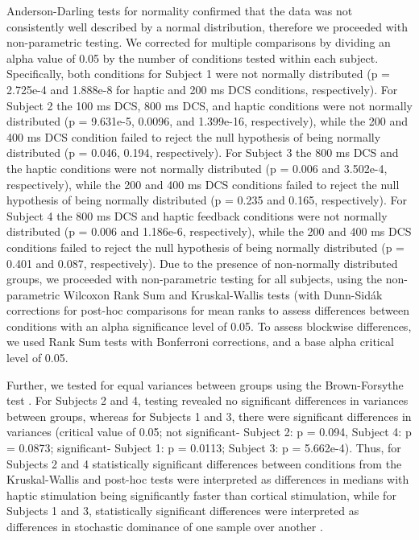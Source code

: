  Anderson-Darling tests for normality confirmed that the data was not consistently well described by a normal distribution, therefore we proceeded with non-parametric testing. We corrected for multiple comparisons by dividing an alpha value of 0.05 by the number of conditions tested within each subject. Specifically, both conditions for Subject 1 were not normally distributed (p = 2.725e-4 and 1.888e-8 for haptic and 200 ms DCS conditions, respectively). For Subject 2 the 100 ms DCS, 800 ms DCS, and haptic conditions were not normally distributed (p = 9.631e-5, 0.0096, and 1.399e-16, respectively), while the 200 and 400 ms DCS condition failed to reject the null hypothesis of being normally distributed (p = 0.046, 0.194, respectively). For Subject 3 the 800 ms DCS and the haptic conditions were not normally distributed (p = 0.006 and 3.502e-4, respectively), while the 200 and 400 ms DCS conditions failed to reject the null hypothesis of being normally distributed (p = 0.235 and 0.165, respectively). For Subject 4 the 800 ms DCS and haptic feedback conditions were not normally distributed (p = 0.006 and 1.186e-6, respectively), while the 200 and 400 ms DCS conditions failed to reject the null hypothesis of being normally distributed (p = 0.401 and 0.087, respectively). Due to the presence of non-normally distributed groups, we proceeded with non-parametric testing for all subjects, using the non-parametric Wilcoxon Rank Sum and Kruskal-Wallis tests (with Dunn-Sidák corrections for post-hoc comparisons for mean ranks\cite{Dinno2015,Sidak1967} to assess differences between conditions with an alpha significance level of 0.05. To assess blockwise differences, we used Rank Sum tests with Bonferroni corrections, and a base alpha critical level of 0.05.
 
 Further, we tested for equal variances between groups using the Brown-Forsythe test \cite{Brown1974}. For Subjects 2 and 4, testing revealed no significant differences in variances between groups, whereas for Subjects 1 and 3, there were significant differences in variances (critical value of 0.05; not significant- Subject 2: p = 0.094, Subject 4: p = 0.0873; significant- Subject 1: p = 0.0113; Subject 3: p = 5.662e-4). Thus, for Subjects 2 and 4 statistically significant differences between conditions from the Kruskal-Wallis and post-hoc tests were interpreted as differences in medians with haptic stimulation being significantly faster than cortical stimulation, while for Subjects 1 and 3, statistically significant differences were interpreted as differences in stochastic dominance of one sample over another \cite{Dinno2015}. 
 

